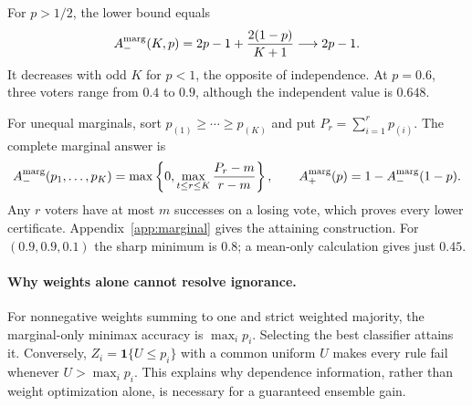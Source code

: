 \documentclass{article}
\newcommand{\ind}{\mathbf 1}
\begin{document}
For $p>1/2$, the lower bound equals
\begin{equation}
 A_-^{\rm marg}(K,p)=2p-1+\frac{2(1-p)}{K+1}\longrightarrow2p-1.
\end{equation}
It decreases with odd $K$ for $p<1$, the opposite of independence. At $p=0.6$, three voters range from $0.4$ to $0.9$, although the independent value is $0.648$.

For unequal marginals, sort $p_{(1)}\ge\cdots\ge p_{(K)}$ and put $P_r=\sum_{i=1}^r p_{(i)}$. The complete marginal answer is
\begin{equation}\label{eq:heterogeneous}
 A_-^{\rm marg}(p_1,\ldots,p_K)
 =\max\left\{0,\max_{t\le r\le K}\frac{P_r-m}{r-m}\right\},\qquad
 A_+^{\rm marg}(p)=1-A_-^{\rm marg}(1-p).
\end{equation}
Any $r$ voters have at most $m$ successes on a losing vote, which proves every lower certificate. Appendix~\ref{app:marginal} gives the attaining construction. For $(0.9,0.9,0.1)$ the sharp minimum is $0.8$; a mean-only calculation gives just $0.45$.

\paragraph{Why weights alone cannot resolve ignorance.}
For nonnegative weights summing to one and strict weighted majority, the marginal-only minimax accuracy is $\max_i p_i$. Selecting the best classifier attains it. Conversely, $Z_i=\ind\{U\le p_i\}$ with a common uniform $U$ makes every rule fail whenever $U>\max_i p_i$. This explains why dependence information, rather than weight optimization alone, is necessary for a guaranteed ensemble gain.

\clearpage
\end{document}
